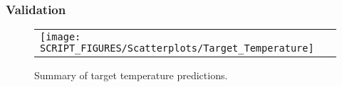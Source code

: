 \clearpage


\subsubsection*{Validation}

\begin{figure}[!ht]
\begin{center}
\begin{tabular}{l}
\texttt{[image: SCRIPT\_FIGURES/Scatterplots/Target\_Temperature]}
\end{tabular}
\end{center}
\caption[Summary of target temperature predictions]
{Summary of target temperature predictions.}
\label{Surface_Temperature_Steel_Summary}
\end{figure}

